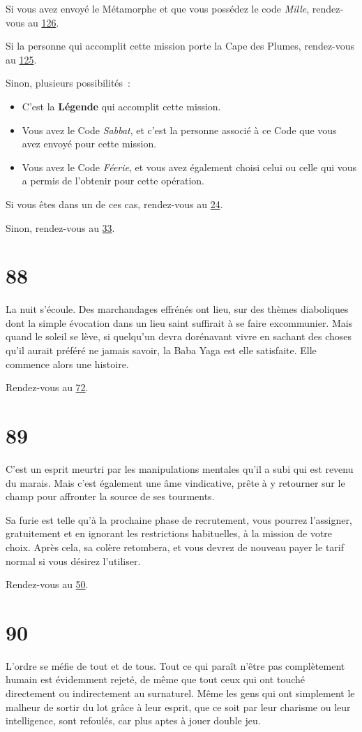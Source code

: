 \documentclass{report}
\newcommand{\gsection}[1]{
    \section{#1}
    \label{section-#1}
}
\newcommand{\glink}[1]{\hyperref[section-#1]{#1}}
\newcommand{\hero}[1]{
    \textbf{#1}
}
\begin{document}
Si vous avez envoyé le Métamorphe et que vous possédez le code \emph{Mille}, rendez-vous au \glink{126}.

Si la personne qui accomplit cette mission porte la Cape des Plumes, rendez-vous au \glink{125}.

Sinon, plusieurs possibilités :
\begin{itemize}
\item C'est la \hero{Légende} qui accomplit cette mission.
\item Vous avez le Code \emph{Sabbat}, et c'est la personne associé à ce Code que vous avez envoyé pour cette mission.
\item Vous avez le Code \emph{Féerie}, et vous avez également choisi celui ou celle qui vous a permis de l'obtenir pour cette opération.
\end{itemize}

Si vous êtes dans un de ces cas, rendez-vous au \glink{24}.

Sinon, rendez-vous au \glink{33}.

\gsection{88}

La nuit s'écoule. Des marchandages effrénés ont lieu, sur des thèmes diaboliques dont la simple évocation dans un lieu saint suffirait à se faire excommunier. Mais quand le soleil se lève, si quelqu'un devra dorénavant vivre en sachant des choses qu'il aurait préféré ne jamais savoir, la Baba Yaga est elle satisfaite. Elle commence alors une histoire.

Rendez-vous au \glink{72}.

\gsection{89}

C'est un esprit meurtri par les manipulations mentales qu'il a subi qui est revenu du marais. Mais c'est également une âme vindicative, prête à y retourner sur le champ pour affronter la source de ses tourments.

Sa furie est telle qu'à la prochaine phase de recrutement, vous pourrez l'assigner, gratuitement et en ignorant les restrictions habituelles, à la mission de votre choix. Après cela, sa colère retombera, et vous devrez de nouveau payer le tarif normal si vous désirez l'utiliser.

Rendez-vous au \glink{50}.

\gsection{90}

L'ordre se méfie de tout et de tous. Tout ce qui paraît n'être pas complètement humain est évidemment rejeté, de même que tout ceux qui ont touché directement ou indirectement au surnaturel. Même les gens qui ont simplement le malheur de sortir du lot grâce à leur esprit, que ce soit par leur charisme ou leur intelligence, sont refoulés, car plus aptes à jouer double jeu.
\end{document}
